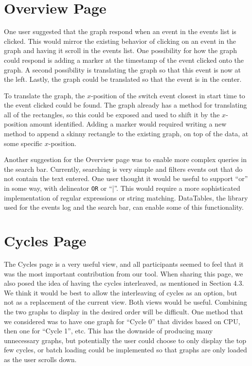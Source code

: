 \documentclass{hmcclinic}
\begin{document}
\section{Overview Page}
One user suggested that the graph respond when an event in the events list is clicked.
 This would mirror the existing behavior of clicking on an event in the graph and having
  it scroll in the events list. One possibility for how the graph could respond is adding
   a marker at the timestamp of the event clicked onto the graph. A second possibility is
    translating the graph so that this event is now at the left. Lastly, the graph could 
    be translated so that the event is in the center.

  To translate the graph, the $x$-position of the switch event closest in start time to
   the event clicked could be found. The graph already has a method for translating all
    of the rectangles, so this could be exposed and used to shift it by the $x$-position
     amount identified. Adding a marker would required writing a new method to append a
      skinny rectangle to the existing graph, on top of the data, at some
      specific $x$-position.

  Another suggestion for the Overview page was to enable more complex queries in the 
  search bar. Currently, searching is very simple and filters events out that do not 
  contain the text entered. One user thought it would be useful to support
  ``or'' in 
  some way, with delineator \texttt{OR} or ``|''. This would require a more
  sophisticated implementation 
  of regular expressions or string matching. DataTables, the library used for the 
  events log and the search bar, can enable some of this functionality.

  \section{Cycles Page}

  The Cycles page is a very useful view, and all participants seemed to feel that 
  it was the most important contribution from our tool. When sharing this page, 
  we also posed the idea of having the cycles interleaved, as mentioned in 
  Section 4.3. We think it would be best to allow the interleaving of cycles as 
  an option, but not as a replacement of the current view. Both views would be 
  useful. Combining the two graphs to display in the desired order will be 
  difficult. One method that we considered was to have one graph for ``Cycle 0'' 
  that divides based on CPU, then one for ``Cycle 1'', etc. This has the downside 
  of producing many unnecessary graphs, but potentially the user could choose to 
  only display the top few cycles, or batch loading could be implemented so that 
  graphs are only loaded as the user scrolls down.
\end{document}
